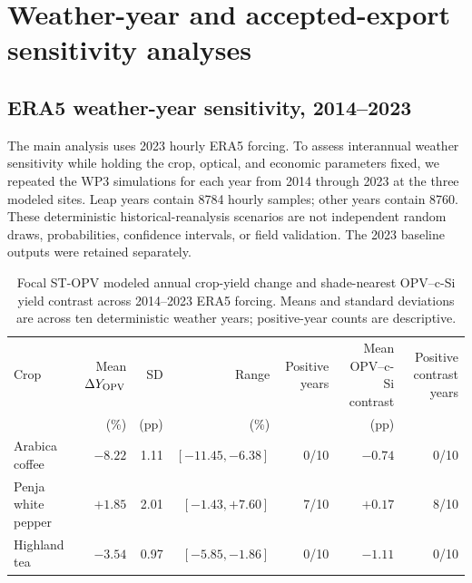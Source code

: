 
\section{Weather-year and accepted-export sensitivity analyses}
\label{sec:sm_weather_export}

\subsection{ERA5 weather-year sensitivity, 2014--2023}
\label{sec:sm_weather_decade}

The main analysis uses 2023 hourly ERA5 forcing. To assess interannual weather sensitivity while holding the crop, optical, and economic parameters fixed, we repeated the WP3 simulations for each year from 2014 through 2023 at the three modeled sites. Leap years contain 8784 hourly samples; other years contain 8760. These deterministic historical-reanalysis scenarios are not independent random draws, probabilities, confidence intervals, or field validation. The 2023 baseline outputs were retained separately.

\begin{table}[htbp]
  \centering
  \scriptsize
  \caption{Focal ST-OPV modeled annual crop-yield change and shade-nearest OPV--c-Si yield contrast across 2014--2023 ERA5 forcing. Means and standard deviations are across ten deterministic weather years; positive-year counts are descriptive.}
  \label{tab:weather_decade}
  \begin{tabular}{@{}lrrrrrr@{}}
    \toprule
    Crop & Mean $\Delta Y_{\rm OPV}$ & SD & Range & Positive years & Mean OPV--c-Si contrast & Positive contrast years \\
    & (\unit{\percent}) & (pp) & (\unit{\percent}) & & (pp) & \\
    \midrule
    Arabica coffee & $-8.22$ & 1.11 & $[-11.45,-6.38]$ & 0/10 & $-0.74$ & 0/10 \\
    Penja white pepper & $+1.85$ & 2.01 & $[-1.43,+7.60]$ & 7/10 & $+0.17$ & 8/10 \\
    Highland tea & $-3.54$ & 0.97 & $[-5.85,-1.86]$ & 0/10 & $-1.11$ & 0/10 \\
    \bottomrule
  \end{tabular}
\end{table}

